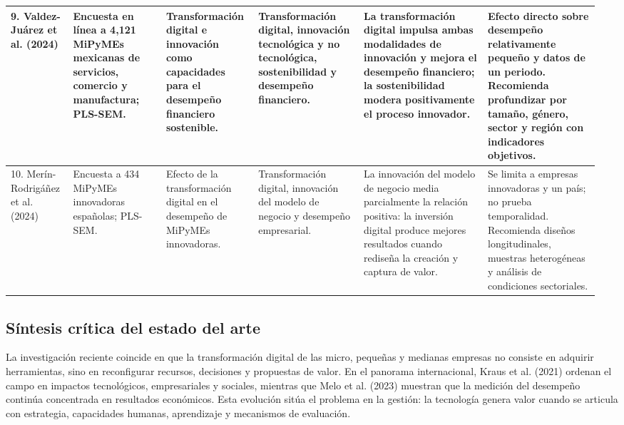 \documentclass[spanish,letterpaper,oneside]{article}
\begin{document}
\begin{landscape}
\begin{longtable}{@{}p{0.105\linewidth}p{0.155\linewidth}p{0.145\linewidth}p{0.17\linewidth}p{0.205\linewidth}p{0.18\linewidth}@{}}
\midrule
9. Valdez-Juárez et al. (2024) & Encuesta en línea a 4,121 MiPyMEs mexicanas de servicios, comercio y manufactura; PLS-SEM. & Transformación digital e innovación como capacidades para el desempeño financiero sostenible. & Transformación digital, innovación tecnológica y no tecnológica, sostenibilidad y desempeño financiero. & La transformación digital impulsa ambas modalidades de innovación y mejora el desempeño financiero; la sostenibilidad modera positivamente el proceso innovador. & Efecto directo sobre desempeño relativamente pequeño y datos de un periodo. Recomienda profundizar por tamaño, género, sector y región con indicadores objetivos. \\
\midrule
10. Merín-Rodrigáñez et al. (2024) & Encuesta a 434 MiPyMEs innovadoras españolas; PLS-SEM. & Efecto de la transformación digital en el desempeño de MiPyMEs innovadoras. & Transformación digital, innovación del modelo de negocio y desempeño empresarial. & La innovación del modelo de negocio media parcialmente la relación positiva: la inversión digital produce mejores resultados cuando rediseña la creación y captura de valor. & Se limita a empresas innovadoras y un país; no prueba temporalidad. Recomienda diseños longitudinales, muestras heterogéneas y análisis de condiciones sectoriales. \\
\bottomrule
\end{longtable}
\endgroup
\end{landscape}
\clearpage
\pagestyle{fancy}

\subsection[Estado del arte]{Síntesis crítica del estado del arte}

La investigación reciente coincide en que la transformación digital de las micro, pequeñas y medianas empresas no consiste en adquirir herramientas, sino en reconfigurar recursos, decisiones y propuestas de valor. En el panorama internacional, Kraus et al. (2021) ordenan el campo en impactos tecnológicos, empresariales y sociales, mientras que Melo et al. (2023) muestran que la medición del desempeño continúa concentrada en resultados económicos. Esta evolución sitúa el problema en la gestión: la tecnología genera valor cuando se articula con estrategia, capacidades humanas, aprendizaje y mecanismos de evaluación.
\end{document}
